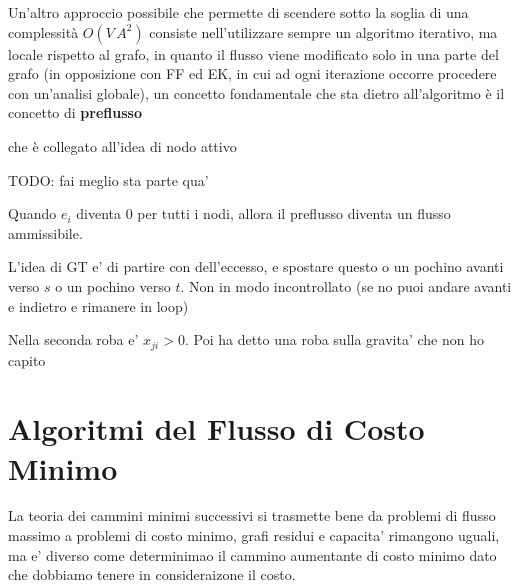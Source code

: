 Un'altro approccio possibile che permette di scendere sotto la soglia di una complessità $O(V\,A^2)$ consiste nell'utilizzare sempre un algoritmo iterativo, ma locale rispetto al grafo, in quanto il flusso viene modificato solo in una parte del grafo (in opposizione con FF ed EK, in cui ad ogni iterazione occorre procedere con un’analisi globale), un concetto fondamentale che sta dietro all'algoritmo è il concetto di \textbf{preflusso}


che è collegato all'idea di nodo attivo

TODO: fai meglio sta parte qua'

Quando $ e_i $ diventa 0 per tutti i nodi, allora il preflusso diventa un flusso ammissibile.

L'idea di GT e' di partire con dell'eccesso, e spostare questo o un pochino avanti verso $ s  $ o un pochino verso $ t $. Non in modo incontrollato (se no puoi andare avanti e indietro e rimanere in loop)

Nella seconda roba e' $ x_{ji} > 0 $. Poi ha detto una roba sulla gravita' che non ho capito
\section{Algoritmi del Flusso di Costo Minimo}

La teoria dei cammini minimi successivi si trasmette bene da problemi di flusso massimo a problemi di costo minimo, grafi residui e capacita' rimangono uguali, ma e' diverso come determinimao il cammino aumentante di costo minimo dato che dobbiamo tenere in consideraizone il costo.


